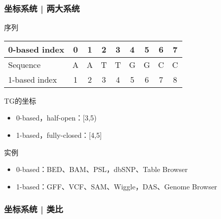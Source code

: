 \documentclass[table]{beamer}
\begin{document}
\begin{frame}
  \frametitle{坐标系统 | 两大系统}
  \begin{block}{序列}
  \begin{table}
    \centering
    \begin{tabular}{lcccccccc}
      \hline
      0-based index & 0 & 1 & 2 & 3 & 4 & 5 & 6 & 7\\
      \hline
      Sequence & A & A & T & T & G & G & C & C\\
      \hline
      1-based index & 1 & 2 & 3 & 4 & 5 & 6 & 7 & 8\\
      \hline
    \end{tabular}
  \end{table}
  \end{block}
  \pause
  \begin{block}{TG的坐标}
    \begin{itemize}
      \item 0-based，half-open：[3,5)
      \item 1-based，fully-closed：[4,5]
    \end{itemize}
  \end{block}
  \pause
  \begin{block}{实例}
    \begin{itemize}
      \item 0-based：BED、BAM、PSL，dbSNP、Table Browser
      \item 1-based：GFF、VCF、SAM、Wiggle，DAS、Genome Browser
    \end{itemize}
  \end{block}
\end{frame}

\begin{frame}
  \frametitle{坐标系统 | 类比}
  \begin{columns}
  \end{columns}
\end{frame}
\end{document}
